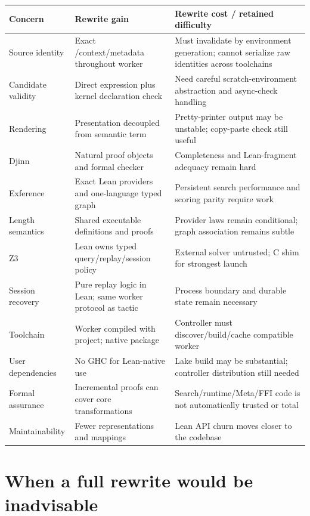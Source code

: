 \documentclass[10pt,letterpaper,oneside]{report}
\newcommand{\code}[1]{\texttt{\detokenize{#1}}}
\begin{document}
\begin{longtable}{@{}L{0.20\textwidth}L{0.34\textwidth}L{0.38\textwidth}@{}}
\toprule
\textbf{Concern} & \textbf{Rewrite gain} & \textbf{Rewrite cost / retained difficulty} \\
\midrule
\endhead
Source identity & Exact \code{Name}/context/metadata throughout worker & Must invalidate by environment generation; cannot serialize raw identities across toolchains \\
Candidate validity & Direct expression plus kernel declaration check & Need careful scratch-environment abstraction and async-check handling \\
Rendering & Presentation decoupled from semantic term & Pretty-printer output may be unstable; copy-paste check still useful \\
Djinn & Natural proof objects and formal checker & Completeness and Lean-fragment adequacy remain hard \\
Exference & Exact Lean providers and one-language typed graph & Persistent search performance and scoring parity require work \\
Length semantics & Shared executable definitions and proofs & Provider laws remain conditional; graph association remains subtle \\
Z3 & Lean owns typed query/replay/session policy & External solver untrusted; C shim for strongest launch \\
Session recovery & Pure replay logic in Lean; same worker protocol as tactic & Process boundary and durable state remain necessary \\
Toolchain & Worker compiled with project; native package & Controller must discover/build/cache compatible worker \\
User dependencies & No GHC for Lean-native use & Lake build may be substantial; controller distribution still needed \\
Formal assurance & Incremental proofs can cover core transformations & Search/runtime/Meta/FFI code is not automatically trusted or total \\
Maintainability & Fewer representations and mappings & Lean API churn moves closer to the codebase \\
\bottomrule
\end{longtable}

\section{When a full rewrite would be inadvisable}
\end{document}
